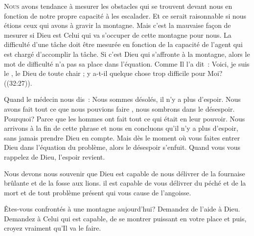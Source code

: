 \lettrine{N}{ous} avons tendance à mesurer les obstacles
 qui se trouvent devant nous en fonction de notre propre capacité
 à les escalader. Et ce serait raisonnable si nous étions ceux qui avons
 à gravir la montagne. Mais c'est la mauvaise façon de mesurer
 si Dieu est Celui qui va s'occuper de cette montagne pour nous.
 La difficulté d'une tâche doit être mesurée en fonction de la capacité
 de l'agent qui est chargé d'accomplir la tâche.
 Si c'est Dieu qui s'affronte à la montagne, alors le mot
 de  \og difficulté \fg{}
 n'a pas sa place dans l'équation.
 Comme Il l'a dit~: 
 \og Voici, je suis le \Seigneur, le Dieu de toute chair ;
 y a-t-il quelque chose trop difficile pour Moi? \fg{}
 ((32:27)). 


Quand le médecin nous dis~: 
 \og Nous sommes désolés, il n'y a plus d'espoir.
 Nous avons fait tout ce que nous pouvions faire \fg{},
 nous sombrons dans le désespoir. Pourquoi?
 Parce que les hommes ont fait tout ce qui était en leur pouvoir.
 Nous arrivons à la fin de cette phrase et nous en concluons
 qu'il n'y a plus d'espoir, sans jamais prendre Dieu en compte.
 Mais dès  le moment où vous faites entrer Dieu
 dans l'équation du problème, alors le désespoir s'enfuit.
 Quand vous vous rappelez de Dieu, l'espoir revient. 

Nous devons nous souvenir que Dieu est capable de nous délivrer
 de la fournaise brûlante et de la fosse aux lions.
 il est capable de vous délivrer du péché et de la mort
 \ocadr et de tout problème présent qui vous cause de l'angoisse.

Êtes-vous confrontés à une montagne aujourd'hui? Demandez de l'aide à Dieu.
 Demandez à Celui qui est capable, de se montrer puissant en votre place
 \ocadr et puis, croyez vraiment qu'Il va le faire.

\dvrule






